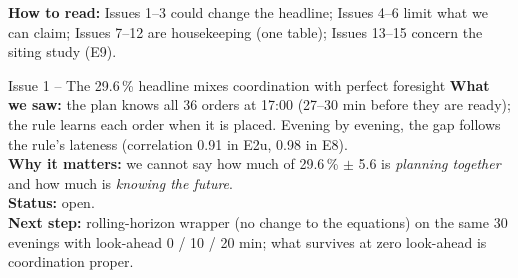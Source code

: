
\noindent\textbf{How to read:} Issues 1--3 could change the headline; Issues 4--6 limit what we can claim; Issues 7--12 are housekeeping (one table); Issues 13--15 concern the siting study (E9).

\begin{issuebox}{Issue 1 -- The 29.6\,\% headline mixes coordination with perfect foresight}
\textbf{What we saw:} the plan knows all 36 orders at 17:00 (27--30 min before they are ready); the rule learns each order when it is placed. Evening by evening, the gap follows the rule's lateness (correlation 0.91 in E2u, 0.98 in E8).\\
\textbf{Why it matters:} we cannot say how much of 29.6\,\% $\pm$ 5.6 is \emph{planning together} and how much is \emph{knowing the future}.\\
\textbf{Status:} open.\\
\textbf{Next step:} rolling-horizon wrapper (no change to the equations) on the same 30 evenings with look-ahead 0 / 10 / 20 min; what survives at zero look-ahead is coordination proper.
\end{issuebox}

